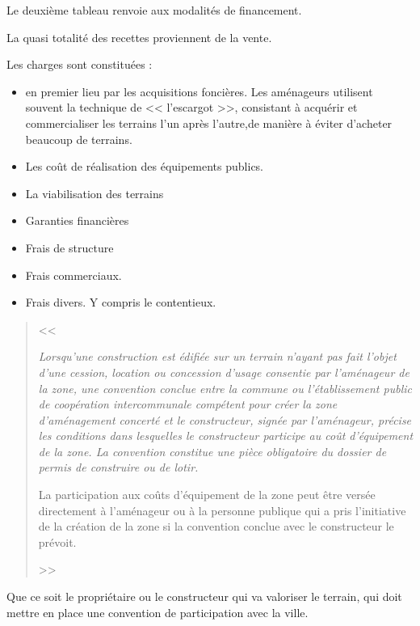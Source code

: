 			Le deuxième tableau renvoie aux modalités de financement.
			
			La quasi totalité des recettes proviennent de la vente.
			
			Les charges sont constituées :
			\begin{itemize}
				\item en premier lieu par les acquisitions foncières.
				Les aménageurs utilisent souvent la technique de << l'escargot >>, consistant à acquérir et commercialiser les terrains l'un après l'autre,de manière à éviter d'acheter beaucoup de terrains.
				
				\item Les coût de réalisation des équipements publics.
				
				\item La viabilisation des terrains
				
				\item Garanties financières
				
				\item Frais de structure
				
				\item Frais commerciaux.
				
				\item Frais divers. Y compris le contentieux.
			\end{itemize}
		
		\begin{quote}
			<< \lips
			
			{\itshape Lorsqu'une construction est édifiée sur un terrain n'ayant pas fait l'objet d'une cession, location ou concession d'usage consentie par l'aménageur de la zone, une convention conclue entre la commune ou l'établissement public de coopération intercommunale compétent pour créer la zone d'aménagement concerté et le constructeur, signée par l'aménageur, précise les conditions dans lesquelles le constructeur participe au coût d'équipement de la zone. La convention constitue une pièce obligatoire du dossier de permis de construire ou de lotir.
				
				\medskip La participation aux coûts d'équipement de la zone peut être versée directement à l'aménageur ou à la personne publique qui a pris l'initiative de la création de la zone si la convention conclue avec le constructeur le prévoit.}
			
			\lips >>
		\end{quote}
		Que ce soit le propriétaire ou le constructeur qui va valoriser le terrain, qui doit mettre en place une convention de participation avec la ville.
		
